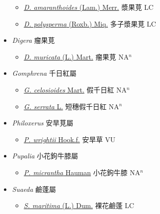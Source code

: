 \begin{itemize}
  \begin{itemize}
        \item[] \href{http://www.theplantlist.org/tpl1.1/search?q=Deeringia+amaranthoides}{\textit{D. amaranthoides} (Lam.) Merr.}   漿果莧 LC
        \item[] \href{http://www.theplantlist.org/tpl1.1/search?q=Deeringia+polysperma}{\textit{D. polysperma} (Roxb.) Miq.}   多子漿果莧 LC
  \end{itemize}
 \item[] \textit{Digera} 瘤果莧
                    
  \begin{itemize}
        \item[] \href{http://www.theplantlist.org/tpl1.1/search?q=Digera+muricata}{\textit{D. muricata} (L.) Mart.}   瘤果莧 NA$^n$
  \end{itemize}
 \item[] \textit{Gomphrena} 千日紅屬
                    
  \begin{itemize}
        \item[] \href{http://www.theplantlist.org/tpl1.1/search?q=Gomphrena+celosioides}{\textit{G. celosioides} Mart.}   假千日紅 NA$^n$
        \item[] \href{http://www.theplantlist.org/tpl1.1/search?q=Gomphrena+serrata}{\textit{G. serrata} L.}   短穗假千日紅 NA$^n$
  \end{itemize}
 \item[] \textit{Philoxerus} 安旱莧屬
                    
  \begin{itemize}
        \item[] \href{http://www.theplantlist.org/tpl1.1/search?q=Philoxerus+wrightii}{\textit{P. wrightii} Hook.f.}   安旱草 VU
  \end{itemize}
 \item[] \textit{Pupalia} 小花鉤牛膝屬
                    
  \begin{itemize}
        \item[] \href{http://www.theplantlist.org/tpl1.1/search?q=Pupalia+micrantha}{\textit{P. micrantha} Hauman}   小花鉤牛膝 NA$^n$
  \end{itemize}
 \item[] \textit{Suaeda} 鹼蓬屬
                    
  \begin{itemize}
        \item[] \href{http://www.theplantlist.org/tpl1.1/search?q=Suaeda+maritima}{\textit{S. maritima} (L.) Dum.}   裸花鹼蓬 LC
  \end{itemize}
  \end{itemize}
